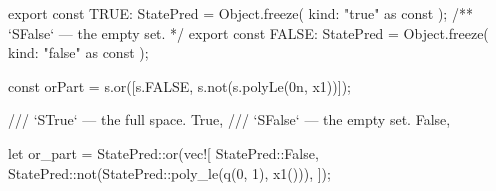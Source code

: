 \begin{tssrc}
export const TRUE: StatePred = Object.freeze({ kind: "true" as const });
/** `SFalse` — the empty set. */
export const FALSE: StatePred = Object.freeze({ kind: "false" as const });
\end{tssrc}
\begin{tssrc}
const orPart = s.or([s.FALSE, s.not(s.polyLe(0n, x1))]);
\end{tssrc}
\begin{rustsrc}
/// `STrue` — the full space.
True,
/// `SFalse` — the empty set.
False,
\end{rustsrc}
\begin{rustsrc}
let or_part = StatePred::or(vec![
    StatePred::False,
    StatePred::not(StatePred::poly_le(q(0, 1), x1())),
]);
\end{rustsrc}
